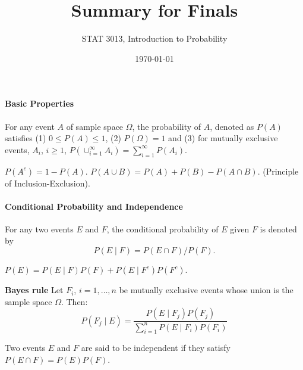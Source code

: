 \documentclass[10pt,twocolumn]{article}
\numberwithin{equation}{section}
\begin{document}

\title{Summary for Finals} 
\author{STAT 3013, Introduction to Probability}
\date{\today}
\maketitle
\paragraph{Basic Properties}
\ben
\item For any event $A$ of sample space $\Omega$, the probability of $A$, denoted as $P(A)$ satisfies (1) $0 \le P(A) \le 1$, (2) $P(\Omega) = 1$ and (3) for mutually exclusive events, $A_i$, $i \ge 1$, $P(\cup_{i=1}^{\infty} A_i) = \sum_{i=1}^{\infty} P(A_i)$. 
\item $P(A^c) = 1 - P(A)$. $P(A \cup B) = P(A) + P(B) - P(A \cap B)$. (Principle of Inclusion-Exclusion). 
\een
\paragraph{Conditional Probability and Independence}
\ben 
\item For any two events $E$ and $F$, the conditional probability of $E$ given $F$ is denoted by 
\[
P(E \mid F) = P(E \cap F)/P(F).
\]
\item $P(E) = P(E \mid F) P(F) + P(E \mid F^c) P(F^c)$.
\item \textbf{Bayes rule} Let $F_i$, $i = 1, \ldots, n$ be mutually exclusive events whose union is the sample space $\Omega$. Then:
\[
P(F_j \mid E) = \frac{P(E \mid F_j)P(F_j)}{\sum_{i=1}^{n} P(E \mid F_i)P(F_i)}
\]
\item Two events $E$ and $F$ are said to be independent if they satisfy $P(E \cap F) = P(E)P(F)$. 
\een
\end{document}
